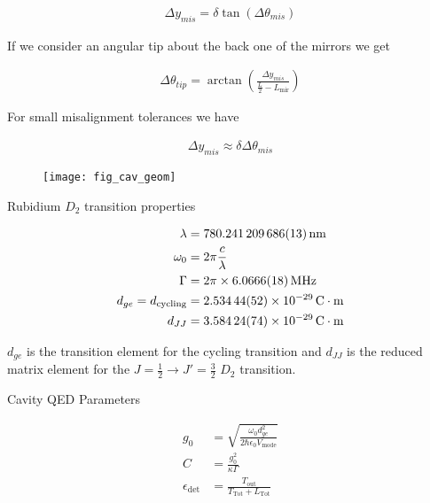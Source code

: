 \documentclass[12pt]{article}
\newcommand{\ep}{\epsilon}
\begin{document}
\begin{align}
\Delta y_{mis} = \delta \tan(\Delta \theta_{mis})
\end{align}

If we consider an angular tip about the back one of the mirrors we get

\begin{align}
\Delta \theta_{tip} = \arctan\left(\frac{\Delta y_{mis}}{\frac{L}{2} - L_{\text{mir}}}\right)
\end{align}

For small misalignment tolerances we have

\begin{align}
\Delta y_{mis} \approx \delta \Delta\theta_{mis}
\end{align}

\begin{figure}[bt!] 
\texttt{[image: fig\_cav\_geom]}
\caption{}
\end{figure}

Rubidium $D_2$ transition properties

\begin{align}
\lambda &= \SI{780.241 209 686(13)}{nm}\\
\omega_0 &= 2\pi \frac{c}{\lambda}\\
\Gamma &= 2\pi \times \SI{6.066 6(18)}{MHz}\\
d_{ge} = d_{\text{cycling}} &= \SI{2.534 44(52)d-29}{C\cdot m}\\
d_{JJ} &= \SI{3.58424(74)d-29}{C \cdot m}
\end{align}

$d_{ge}$ is the transition element for the cycling transition and $d_{JJ}$ is the reduced matrix element for the $J=\frac{1}{2} \rightarrow J'=\frac{3}{2}$ $D_2$ transition.

Cavity QED Parameters

\begin{align}
g_0 &= \sqrt{\frac{\omega_0 d_{ge}^2}{2\hbar \epsilon_0 V_{\text{mode}}}}\\
C &= \frac{g_0^2}{\kappa \Gamma}\\
\ep_{\text{det}} &= \frac{T_{\text{out}}}{T_{\text{Tot}} + L_{\text{Tot}}}
\end{align}
\end{document}
